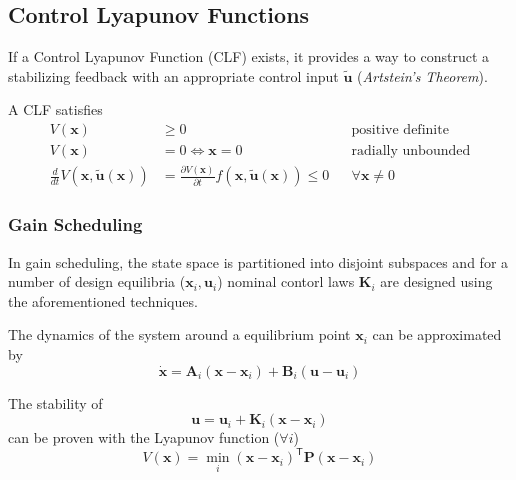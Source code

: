 \subsection{Control Lyapunov Functions}
If a Control Lyapunov Function (CLF) exists, it provides a way to construct a stabilizing feedback with an appropriate control input $\tilde{\mathbf{u}}$ (\textit{Artstein's Theorem}).

\newpar{}
A CLF satisfies
\noindent\begin{align*}
    V(\mathbf{x})                                              & \geq 0                                                                                           &  & \text{positive definite}  \\
    V(\mathbf{x})                                              & = 0 \Leftrightarrow \mathbf{x} = 0                                                               &  & \text{radially unbounded} \\
    \frac{d}{dt} V(\mathbf{x}, \tilde{\mathbf{u}}(\mathbf{x})) & = \frac{\partial V(\mathbf{x})}{\partial t} f(\mathbf{x}, \tilde{\mathbf{u}}(\mathbf{x})) \leq 0 &  & \forall \mathbf{x}\neq 0
\end{align*}

\subsubsection{Gain Scheduling}
In gain scheduling, the state space is partitioned into disjoint subspaces and for a number of design equilibria ($\mathbf{x}_i, \mathbf{u}_i$)  nominal contorl laws $\mathbf{K}_i$ are designed using the aforementioned techniques.

\newpar{}
The dynamics of the system around a equilibrium point $\mathbf{x}_i$ can be approximated by
\noindent\begin{equation*}
    \dot{\mathbf{x}} = \mathbf{A}_i(\mathbf{x}-\mathbf{x}_i) + \mathbf{B}_i(\mathbf{u}-\mathbf{u}_i)
\end{equation*}

The stability of
\noindent\begin{equation*}
    \mathbf{u} = \mathbf{u}_i+\mathbf{K}_i(\mathbf{x}-\mathbf{x}_i)
\end{equation*}
can be proven with the Lyapunov function ($\forall i$)
\noindent\begin{equation*}
    V(\mathbf{x}) = \min_{i} {(\mathbf{x}-\mathbf{x}_i)}^{\mathsf{T}}\mathbf{P}(\mathbf{x}-\mathbf{x}_i)
\end{equation*}

